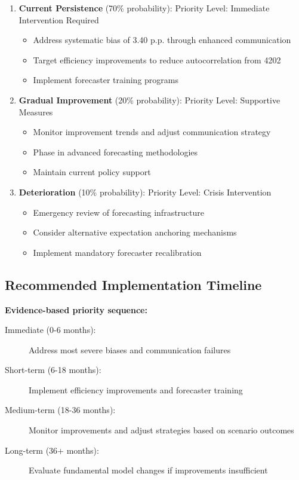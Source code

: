 \documentclass[11pt,a4paper]{article}
\begin{document}
\begin{enumerate}
\item \textbf{Current Persistence} (70\% probability):
Priority Level: Immediate Intervention Required
\begin{itemize}
  \item Address systematic bias of 3.40 p.p. through enhanced communication
  \item Target efficiency improvements to reduce autocorrelation from 4202
  \item Implement forecaster training programs
\end{itemize}
\item \textbf{Gradual Improvement} (20\% probability):
Priority Level: Supportive Measures
\begin{itemize}
  \item Monitor improvement trends and adjust communication strategy
  \item Phase in advanced forecasting methodologies
  \item Maintain current policy support
\end{itemize}
\item \textbf{Deterioration} (10\% probability):
Priority Level: Crisis Intervention
\begin{itemize}
\item Emergency review of forecasting infrastructure
\item Consider alternative expectation anchoring mechanisms
\item Implement mandatory forecaster recalibration
\end{itemize}
\end{enumerate}

\subsection{Recommended Implementation Timeline}
\textbf{Evidence-based priority sequence:}

\begin{description}
  \item[Immediate (0-6 months):] Address most severe biases and communication failures
  \item[Short-term (6-18 months):] Implement efficiency improvements and forecaster training
  \item[Medium-term (18-36 months):] Monitor improvements and adjust strategies based on scenario outcomes
  \item[Long-term (36+ months):] Evaluate fundamental model changes if improvements insufficient
\end{description}
\end{document}
